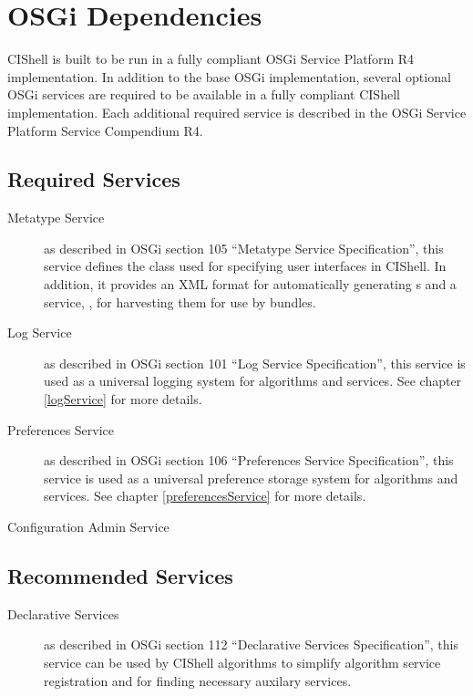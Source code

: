 \section{OSGi Dependencies}

CIShell is built to be run in a fully compliant OSGi Service Platform R4
implementation. In addition to the base OSGi implementation, several
optional OSGi services are required to be available in a fully compliant CIShell
implementation. Each additional required service is described in the OSGi
Service Platform Service Compendium R4.

\subsection*{Required Services}
\begin{description}
  \item[Metatype Service] as described in OSGi section 105 ``Metatype Service
  Specification'', this service defines the  class used
  for specifying user interfaces in CIShell. In addition, it provides an XML 
  format for automatically generating s and a service,
 , for harvesting them for use by bundles.
  \item[Log Service] as described in OSGi section 101 ``Log Service 
  Specification'', this service is used as a universal logging system for 
  algorithms and services. See chapter \ref{logService} for more details.   
  \item[Preferences Service] as described in OSGi section 106 ``Preferences
  Service Specification'', this service is used as a universal preference storage
  system for algorithms and services. See chapter \ref{preferencesService} for
  more details.
  \item[Configuration Admin Service] 
\end{description}

\subsection*{Recommended Services}
\begin{description}
  
  \item[Declarative Services] as described in OSGi section 112 ``Declarative
  Services Specification'', this service can be used by CIShell algorithms to
  simplify algorithm service registration and for finding necessary auxilary services.\item[]
\end{description}
